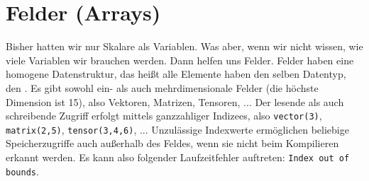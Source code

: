 \section{Felder (Arrays)}

Bisher hatten wir nur Skalare als Variablen. Was aber, wenn wir nicht wissen, wie viele Variablen wir brauchen werden. Dann helfen uns Felder. Felder haben eine homogene Datenstruktur, das heißt alle Elemente haben den selben Datentyp, den . Es gibt sowohl ein- als auch mehrdimensionale Felder (die höchste Dimension ist 15), also Vektoren, Matrizen, Tensoren, ... Der lesende als auch schreibende Zugriff erfolgt mittels ganzzahliger Indizees, also \texttt{vector(3)}, \texttt{matrix(2,5)}, \texttt{tensor(3,4,6)}, ... Unzulässige Indexwerte ermöglichen beliebige Speicherzugriffe auch außerhalb des Feldes, wenn sie nicht beim Kompilieren erkannt werden. Es kann also folgender Laufzeitfehler auftreten: \texttt{Index out of bounds}.